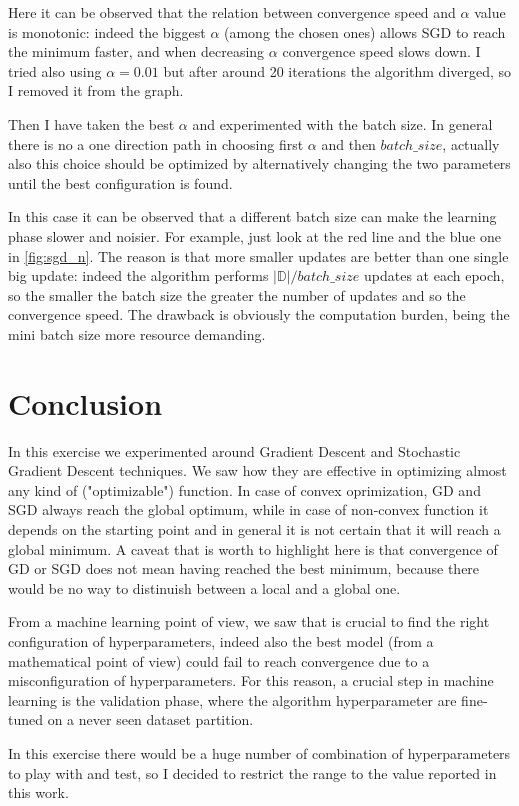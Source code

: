 \documentclass[a4paper,10pt]{report}
\begin{document}
Here it can be observed that the relation between convergence speed and $\alpha$ value is monotonic: indeed the biggest $\alpha$ (among the chosen ones) allows SGD to reach the minimum faster, and when decreasing $\alpha$ convergence speed slows down.
I tried also using $\alpha=0.01$ but after around 20 iterations the algorithm diverged, so I removed it from the graph.

Then I have taken the best $\alpha$ and experimented with the batch size. In general there is no a one direction path in choosing first $\alpha$ and then $batch\_size$, actually also this choice should be optimized by alternatively changing the two parameters until the best configuration is found.

In this case it can be observed that a different batch size can make the learning phase slower and noisier. For example, just look at the red line and the blue one in \ref{fig:sgd_n}.
The reason is that more smaller updates are better than one single big update: indeed the algorithm performs $|\mathbb{D}|/batch\_size$ updates at each epoch, so the smaller the batch size the greater the number of updates and so the convergence speed.
The drawback is obviously the computation burden, being the mini batch size more resource demanding.

\chapter{Conclusion}\label{chap:conclusion}
In this exercise we experimented around Gradient Descent and Stochastic Gradient Descent techniques. We saw how they are effective in optimizing almost any kind of ("optimizable") function.
In case of convex oprimization, GD and SGD always reach the global optimum, while in case of non-convex function it depends on the starting point and in general it is not certain that it will reach a global minimum. A caveat that is worth to highlight here is that convergence of GD or SGD does not mean having reached the best minimum, because there would be no way to distinuish between a local and a global one.

From a machine learning point of view, we saw that is crucial to find the right configuration of hyperparameters, indeed also the best model (from a mathematical point of view) could fail to reach convergence due to a misconfiguration of hyperparameters.
For this reason, a crucial step in machine learning is the validation phase, where the algorithm hyperparameter are fine-tuned on a never seen dataset partition.

In this exercise there would be a huge number of combination of hyperparameters to play with and test, so I decided to restrict the range to the value reported in this work.
\end{document}
